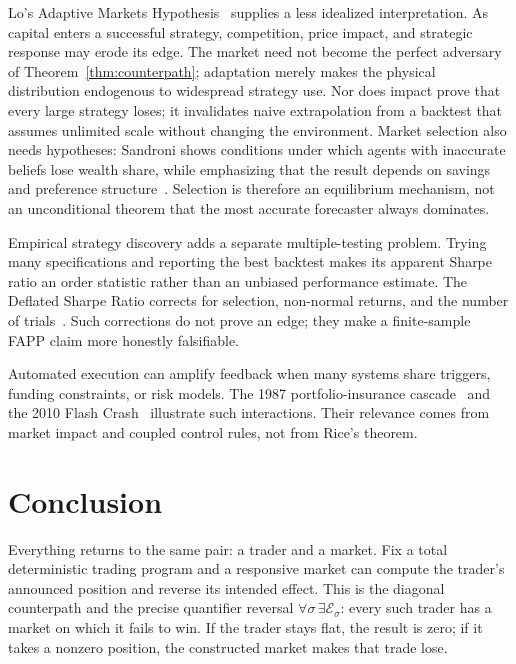 \documentclass[aps,pra,reprint,superscriptaddress,amsmath,amssymb,floatfix]{revtex4-2}
\theoremstyle{plain}
\theoremstyle{definition}
\theoremstyle{remark}
\begin{document}
Lo's Adaptive Markets Hypothesis~\cite{Lo2004} supplies a less idealized
interpretation. As capital enters a successful strategy, competition, price
impact, and strategic response may erode its edge. The market need not become
the perfect adversary of Theorem~\ref{thm:counterpath}; adaptation merely makes
the physical distribution endogenous to widespread strategy use. Nor does
impact prove that every large strategy loses; it invalidates naive
extrapolation from a backtest that assumes unlimited scale without changing
the environment. Market selection also needs hypotheses: Sandroni shows
conditions under which agents with inaccurate beliefs lose wealth share,
while emphasizing that the result depends on savings and preference
structure~\cite{Sandroni2000}. Selection is therefore an equilibrium
mechanism, not an unconditional theorem that the most accurate forecaster
always dominates.

Empirical strategy discovery adds a separate multiple-testing problem. Trying
many specifications and reporting the best backtest makes its apparent Sharpe
ratio an order statistic rather than an unbiased performance estimate. The
Deflated Sharpe Ratio corrects for selection, non-normal returns, and the
number of trials~\cite{BaileyLopez2014}. Such corrections do not prove an edge;
they make a finite-sample FAPP claim more honestly falsifiable.

Automated execution can amplify feedback when many systems share triggers,
funding constraints, or risk models. The 1987 portfolio-insurance
cascade~\cite{Brady1988} and the 2010 Flash Crash~\cite{Kirilenko2017} illustrate
such interactions. Their relevance comes from market impact and coupled
control rules, not from Rice's theorem.

\section{Conclusion}
\label{sec:conclusion}

Everything returns to the same pair: a trader and a market. Fix a total
deterministic trading program and a responsive market can compute the trader's
announced position and reverse its intended effect. This is the diagonal
counterpath and the precise quantifier reversal
\(\forall\sigma\,\exists\mathcal E_\sigma\): every such trader has a market on
which it fails to win. If the trader stays flat, the result is zero; if it
takes a nonzero position, the constructed market makes that trade lose.
\end{document}
